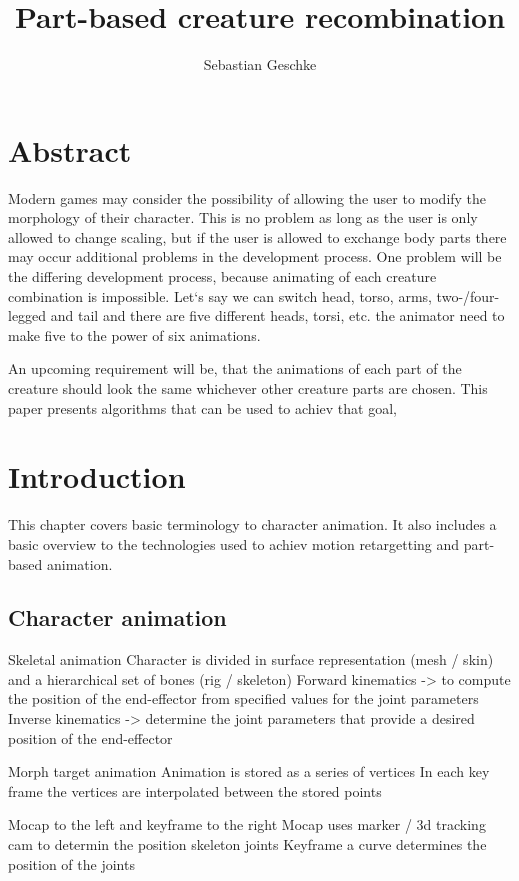 \documentclass[11pt, a4paper]{article} %
\title{Part-based creature recombination}
\author{Sebastian Geschke}
\begin{document}
\maketitle
\section{Abstract}
Modern games may consider the possibility of allowing the user to modify the morphology of their character. This is no problem as long as the user is only allowed to change scaling, but if the user is allowed to exchange body parts there may occur additional problems in the development process. One problem will be the differing development process, because animating of each creature combination is impossible. Let‘s say we can switch head, torso, arms, two-/four-legged and tail and there are five different heads, torsi, etc. the animator need to make five to the power of six animations. 

An upcoming requirement will be, that the animations of each part of the creature should look the same whichever other creature parts are chosen. 
This paper presents algorithms that can be used to achiev that goal,


\section{Introduction}
This chapter covers basic terminology to character animation. It also includes a basic overview to the technologies used to achiev motion retargetting and part-based animation.

\subsection{Character animation}
Skeletal animation
Character is divided in surface representation (mesh / skin) and a hierarchical set of bones (rig  / skeleton)
Forward kinematics -> to compute the position of the end-effector from specified values for the joint parameters
Inverse kinematics -> determine the joint parameters that provide a desired position of the end-effector

Morph target animation
Animation is stored as a series of vertices
In each key frame the vertices are interpolated between the stored points

Mocap to the left and keyframe to the right
Mocap uses marker / 3d tracking cam to determin the position skeleton joints
Keyframe a curve determines the position of the joints
\end{document}
